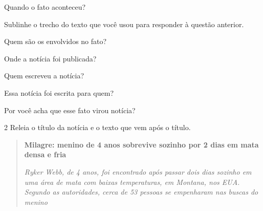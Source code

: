 \begin{escolha}
\begin{escolha}
\begin{escolha}
\item Quando o fato aconteceu?


\item
  Sublinhe o trecho do texto que você usou para responder à questão anterior.


\item Quem são os envolvidos no fato?


\item Onde a notícia foi publicada?


\item Quem escreveu a notícia?


\item Essa notícia foi escrita para quem?


\item Por você acha que esse fato virou notícia?

\end{escolha}

\num{2} Releia o título da notícia e o texto que vem após o título.

\begin{quote}
\textbf{Milagre: menino de 4 anos sobrevive sozinho por 2 dias em mata densa e fria}

\emph{Ryker Webb, de 4 anos, foi encontrado após passar dois dias
sozinho em uma área de mata com baixas temperaturas, em Montana, nos
EUA. Segundo as autoridades, cerca de 53 pessoas se empenharam nas
buscas do menino}
\end{quote}


\end{escolha}
\end{escolha}
